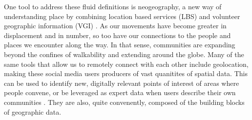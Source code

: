 One tool to address these fluid definitions is neogeography, a new way of understanding place by combining location based services (LBS) and volunteer geographic information (VGI) \cite{Painho2013}. %
As our movements have become greater in displacement and in number, so too have our connections to the people and places we encounter along the way. In that sense, communities are expanding beyond the confines of walkability and extending around the globe. Many of the same tools that allow us to remotely connect with each other include geolocation, making these social media users producers of vast quanitites of spatial data. This can be used to identify new, digitally relevant points of interest of areas where people convene, or be leveraged as expert data when users describe their own communities \cite{Roche2012}. %
They are also, quite convenently, composed of the building blocks of geographic data\cite{Longely2005}. %



